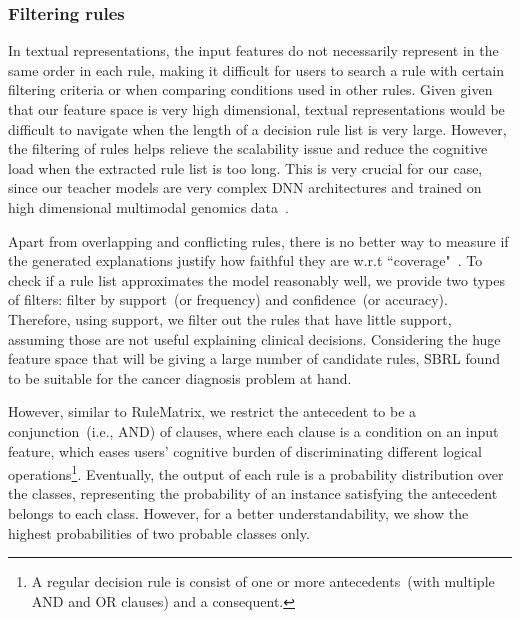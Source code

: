\subsubsection{Filtering rules}
In textual representations, the input features do not necessarily represent in the same order in each rule, making it difficult for users to search a rule with certain filtering criteria or when comparing conditions used in other rules. Given given that our feature space is very high dimensional, textual representations would be difficult to navigate when the length of a decision rule list is very large. However, the filtering of rules helps relieve the scalability issue and reduce the cognitive load when the extracted rule list is too long. This is very crucial for our case, since our teacher models are very complex DNN architectures and trained on high dimensional multimodal genomics data~\cite{ribeiro2018anchors}. 

\hspace*{3.5mm} Apart from overlapping and conflicting rules, there is no better way to measure if the generated explanations justify how faithful they are w.r.t ``coverage"~\cite{ming2018rulematrix}. To check if a rule list approximates the model reasonably well, we provide two types of filters: filter by support~(or frequency) and confidence~(or accuracy). Therefore, using support, we filter out the rules that have little support, assuming those are not useful explaining clinical decisions. Considering the huge feature space that will be giving a large number of candidate rules, SBRL found to be suitable for the cancer diagnosis problem at hand. 

\hspace*{3.5mm} However, similar to RuleMatrix, we restrict the antecedent to be a conjunction~(i.e., AND) of clauses, where each clause is a condition on an input feature, which eases users' cognitive burden of discriminating different logical operations\footnote{A regular  decision rule is consist of one or more antecedents~(with multiple AND and OR clauses) and a consequent.}. Eventually, the output of each rule is a probability distribution over the classes, representing the probability of an instance satisfying the antecedent belongs to each class. However, for a better understandability, we show the highest probabilities of two probable classes only. 


